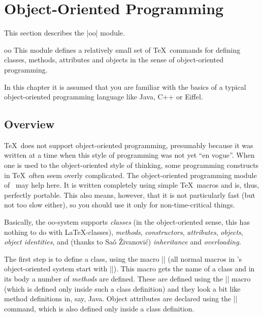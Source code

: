 %
%
%


\section{Object-Oriented Programming}
\label{section-oop}

This section describes the |oo| module.

\begin{pgfmodule}{oo}
    This module defines a relatively small set of \TeX\ commands for defining
    classes, methods, attributes and objects in the sense of object-oriented
    programming.
\end{pgfmodule}

In this chapter it is assumed that you are familiar with the basics of a
typical object-oriented programming language like Java, C++ or Eiffel.


\subsection{Overview}

\TeX\ does not support object-oriented programming, presumably because it was
written at a time when this style of programming was not yet ``en vogue''. When
one is used to the object-oriented style of thinking, some programming
constructs in \TeX\ often seem overly complicated. The object-oriented
programming module of \pgfname\ may help here. It is written completely using
simple \TeX\ macros and is, thus, perfectly portable. This also means, however,
that it is not particularly fast (but not too slow either), so you should use
it only for non-time-critical things.

Basically, the oo-system supports \emph{classes} (in the object-oriented sense,
this has nothing to do with \LaTeX-classes), \emph{methods},
\emph{constructors}, \emph{attributes}, \emph{objects}, \emph{object
identities}, and (thanks to Sa\v o \v Zivanovi\'c) \emph{inheritance} and
\emph{overloading.}

The first step is to define a class, using the macro |\pgfooclass| (all normal
macros in \pgfname's object-oriented system start with |\pgfoo|). This macro
gets the name of a class and in its body a number of \emph{methods} are
defined. These are defined using the |\method| macro (which is defined only
inside such a class definition) and they look a bit like method definitions in,
say, Java. Object attributes are declared using the |\attribute| command, which
is also defined only inside a class definition.

